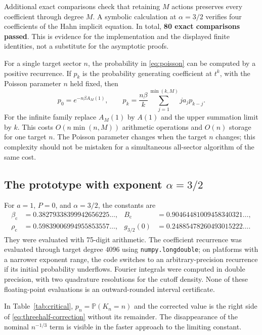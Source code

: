 \documentclass[11pt,a4paper]{article}
\numberwithin{equation}{section}
\theoremstyle{definition}
\theoremstyle{remark}
\newcommand{\Prob}{\mathbb P}
\newcommand{\bc}{\beta_{\mathrm c}}
\newcommand{\rhoc}{\rho_{\mathrm c}}
\newcommand{\Bc}{B_{\mathrm c}}
\begin{document}
Additional exact comparisons check that retaining $M$ actions preserves
every coefficient through degree $M$. A symbolic calculation at
$\alpha=3/2$ verifies four coefficients of the Hahn implicit equation.
In total, \textbf{80 exact comparisons passed}. This is evidence for the
implementation and the displayed finite identities, not a substitute
for the asymptotic proofs.

For a single target sector $n$, the probability in
\eqref{eq:poisson} can be computed by a positive recurrence. If $p_k$ is
the probability generating coefficient at $t^k$, with the Poisson
parameter $n$ held fixed, then
\begin{equation}\label{eq:probability-recurrence}
 p_0=e^{-n\beta A_M(1)},\qquad
 p_k=\frac{n\beta}{k}\sum_{j=1}^{\min(k,M)}j a_jp_{k-j}.
\end{equation}
For the infinite family replace $A_M(1)$ by $A(1)$ and the upper summation
limit by $k$. This costs $O(n\min(n,M))$ arithmetic operations and $O(n)$
storage for one target $n$. The Poisson parameter changes when the target
$n$ changes; this complexity should not be mistaken for a simultaneous
all-sector algorithm of the same cost.

\subsection{The prototype with exponent \texorpdfstring{$\alpha=3/2$}{alpha=3/2}}
For $a=1$, $P=0$, and $\alpha=3/2$, the constants are
\begin{align*}
 \bc&=0.38279338399942656225\ldots,&
 \Bc&=0.90464481009458340321\ldots,\\
 \rhoc&=0.59839006994955853557\ldots,&
 g_{3/2}(0)&=0.24885478260493015222\ldots.
\end{align*}
They were evaluated with 75-digit arithmetic. The coefficient recurrence
was evaluated through target degree $4096$ using
\texttt{numpy.longdouble}; on platforms with a narrower exponent range,
the code switches to an arbitrary-precision recurrence if its initial
probability underflows. Fourier integrals were
computed in double precision, with two quadrature resolutions for the
cutoff density. None of these floating-point evaluations is an
outward-rounded interval certificate.

In Table~\ref{tab:critical}, $p_n=\Prob(K_n=n)$ and the corrected value is
the right side of \eqref{eq:threehalf-correction} without its remainder.
The disappearance of the nominal $n^{-1/3}$ term is visible in the
faster approach to the limiting constant.
\begin{table}[htbp]
\centering\small

\caption{Critical normalized coefficients. The relative error is measured
against $g_{3/2}(0)$; the correction is the first nonzero term allowed by
the cancellation sieve.}
\label{tab:critical}
\end{table}
\end{document}
